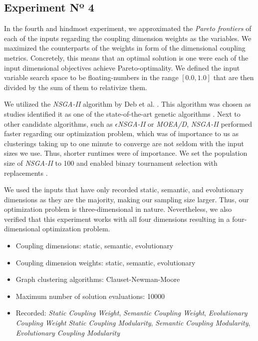 \documentclass[12pt,a4paper]{report}
\begin{document}
\subsection{Experiment Nº 4}

In the fourth and hindmost experiment, we approximated the
\textit{Pareto frontiers} of each of the inputs regarding the coupling dimension
weights as the variables. We maximized the counterparts of the weights in form
of the dimensional coupling metrics. Concretely, this means that an optimal
solution is one were each of the input dimensional objectives achieve
Pareto\hyp optimality. We defined the input variable search space to be
floating\hyp numbers in the range \([0.0, 1.0]\) that are then divided by
the sum of them to relativize them.

We utilized the \textit{NSGA-II} algorithm by Deb et al. \cite{deb2002fast}.
This algorithm was chosen as studies identified
it as one of the state\hyp of\hyp the\hyp art genetic algorithms
\cite{zitzler2001spea2, li2008multiobjective}. Next to other candidate
algorithms, such as \textit{$\epsilon$NSGA-II} or \textit{MOEA/D},
\textit{NSGA-II} performed faster regarding our optimization problem,
which was of importance to us as clusterings taking up to one minute to converge
are not seldom with the input sizes we use. Thus, shorter runtimes were of
importance.
We set the population size of \textit{NSGA-II} to 100 and enabled
binary tournament selection with replacements \cite{hadka2016beginner}.

We used the inputs that have only recorded static, semantic, and
evolutionary dimensions as they are the majority, making our sampling size
larger. Thus, our optimization problem is three\hyp dimensional in nature.
Nevertheless, we also verified that this experiment works with all
four dimensions resulting in a four\hyp dimensional optimization problem.
\begin{itemize}[noitemsep]
    \item Coupling dimensions: static, semantic, evolutionary
    \item Coupling dimension weights: static, semantic, evolutionary
    \item Graph clustering algorithms: Clauset-Newman-Moore
    \item Maximum number of solution evaluations: 10000
    \item Recorded:
    \textit{Static Coupling Weight},
    \textit{Semantic Coupling Weight},
    \textit{Evolutionary Coupling Weight}
    \textit{Static Coupling Modularity},
    \textit{Semantic Coupling Modularity},
    \textit{Evolutionary Coupling Modularity}
\end{itemize}
\end{document}
